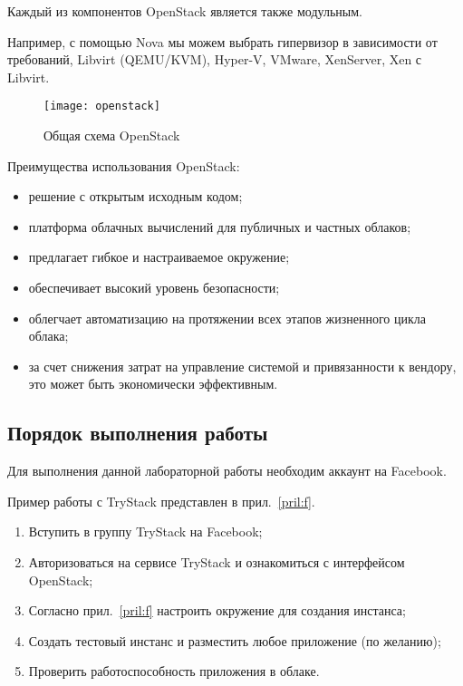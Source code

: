 Каждый из компонентов OpenStack является также модульным.

Например, с помощью Nova мы можем выбрать гипервизор в зависимости от требований, Libvirt (QEMU/KVM), Hyper-V, VMware, XenServer, Xen с Libvirt.

\clearpage

\begin{figure}[ht]
    \centering
	\texttt{[image: openstack]}
	\caption{Общая схема OpenStack}\label{pic:openstack}
\end{figure}

Преимущества использования OpenStack:
\begin{itemize}
    \item решение с открытым исходным кодом;
    \item платформа облачных вычислений для публичных и частных облаков;
    \item предлагает гибкое и настраиваемое окружение;
    \item обеспечивает высокий уровень безопасности;
    \item облегчает автоматизацию на протяжении всех этапов жизненного цикла облака;
    \item за счет снижения затрат на управление системой и привязанности к вендору, это может быть экономически эффективным.
\end{itemize}

\subsection{Порядок выполнения работы}

Для выполнения данной лабораторной работы необходим аккаунт на Facebook.

Пример работы с TryStack представлен в прил.~\ref{pril:f}.

\begin{enumerate}
    \item Вступить в группу TryStack на Facebook;
    \item Авторизоваться на сервисе TryStack и ознакомиться с интерфейсом OpenStack;
    \item Согласно прил.~\ref{pril:f} настроить окружение для создания инстанса;
    \item Создать тестовый инстанс и разместить любое приложение (по желанию);
    \item Проверить работоспособность приложения в облаке.
\end{enumerate}

